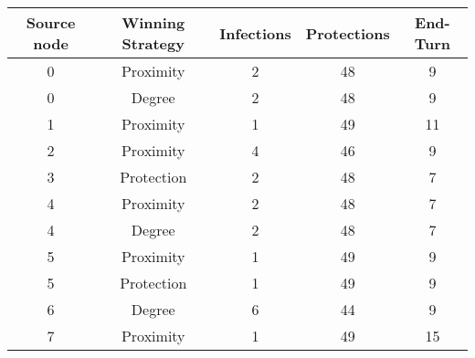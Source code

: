 \documentclass[results.tex]{subfiles}
\begin{document}
    \begin{center}
        \begin{tabular}{| c || c | c | c | c |}
            \hline
            {\bfseries Source node} & {\bfseries Winning Strategy} & {\bfseries Infections} & {\bfseries Protections}
            & {\bfseries End-Turn}
            \\  %
            \hline\hline
            0                       & Proximity                    & 2                      & 48                      & 9                    \\
            \hline
            0                       & Degree                       & 2                      & 48                      & 9                    \\
            \hline
            1                       & Proximity                    & 1                      & 49                      & 11                   \\
            \hline
            2                       & Proximity                    & 4                      & 46                      & 9                    \\
            \hline
            3                       & Protection                   & 2                      & 48                      & 7                    \\
            \hline
            4                       & Proximity                    & 2                      & 48                      & 7                    \\
            \hline
            4                       & Degree                       & 2                      & 48                      & 7                    \\
            \hline
            5                       & Proximity                    & 1                      & 49                      & 9                    \\
            \hline
            5                       & Protection                   & 1                      & 49                      & 9                    \\
            \hline
            6                       & Degree                       & 6                      & 44                      & 9                    \\
            \hline
            7                       & Proximity                    & 1                      & 49                      & 15                   \\

\end{tabular}
\end{center}
\end{document}
